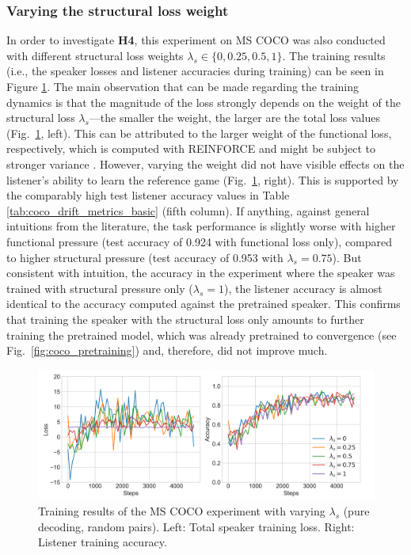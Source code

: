 \subsubsection{Varying the structural loss weight}
In order to investigate \textbf{H4}, this experiment on MS COCO was also conducted with different structural loss weights $\lambda_s \in \{0, 0.25, 0.5, 1\}$. The training results (i.e., the speaker losses and listener accuracies during training) can be seen in Figure \ref{fig:coco_baseline_speaker_loss_listener_acc_all}. The main observation that can be made regarding the training dynamics is that the magnitude of the loss strongly depends on the weight of the structural loss $\lambda_s$---the smaller the weight, the larger are the total loss values (Fig.~\ref{fig:coco_baseline_speaker_loss_listener_acc_all}, left). This can be attributed to the larger weight of the functional loss, respectively, which is computed with REINFORCE and might be subject to stronger variance \parencite[cf.][]{havrylov2017emergence}. However, varying the weight did not have visible effects on the listener's ability to learn the reference game (Fig.~\ref{fig:coco_baseline_speaker_loss_listener_acc_all}, right). 
This is supported by the comparably high test listener accuracy values in Table \ref{tab:coco_drift_metrics_basic} (fifth column). If anything, against general intuitions from the literature, the task performance is slightly worse with higher functional pressure (test accuracy of 0.924 with functional loss only), compared to higher structural pressure (test accuracy of 0.953 with $\lambda_s = 0.75$). But consistent with intuition, the accuracy in the experiment where the speaker was trained with structural pressure only ($\lambda_s = 1$), the listener accuracy is almost identical to the accuracy computed against the pretrained speaker. This confirms that training the speaker with the structural loss only amounts to further training the pretrained model, which was already pretrained to convergence (see Fig.~\ref{fig:coco_pretraining}) and, therefore, did not improve much.

\begin{figure}[h]
	\centering
	\includegraphics[width=\linewidth]{images/coco_refgame_4000_pure_all_Ls_random.png}
	\caption{Training results of the MS COCO experiment with varying $\lambda_s$ (pure decoding, random pairs). Left: Total speaker training loss. Right: Listener training accuracy.}
	\label{fig:coco_baseline_speaker_loss_listener_acc_all}
\end{figure}


